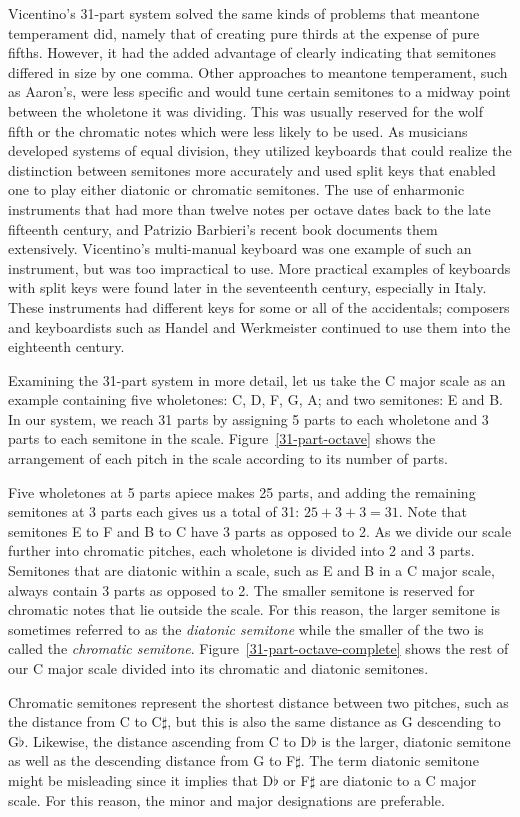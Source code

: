 Vicentino's 31-part system solved the same kinds of problems that meantone temperament
did, namely that of creating pure thirds at the expense of pure fifths. However, it had
the added advantage of clearly indicating that semitones differed in size by one comma.
Other approaches to meantone temperament, such as Aaron's, were less specific and would
tune certain semitones to a midway point between the wholetone it was dividing.  This
was usually reserved for the wolf fifth or the chromatic notes which were less likely
to be used.  As musicians developed systems of equal division, they utilized keyboards
that could realize the distinction between semitones more accurately and used split
keys that enabled one to play either diatonic or chromatic semitones.  The use of
enharmonic instruments that had more than twelve notes per octave dates back to the
late fifteenth century, and Patrizio Barbieri's recent book documents them
extensively.\autocite{PB:1} Vicentino's multi-manual keyboard was one example of such
an instrument, but was too impractical to use. More practical examples of keyboards
with split keys were found later in the seventeenth century, especially in Italy. These
instruments had different keys for some or all of the accidentals; composers and keyboardists
such as Handel and Werkmeister continued to use them into the eighteenth century.
\autocite[108]{MB:1}

Examining the 31-part system in more detail, let us take the C major scale as an example containing
five wholetones: C, D, F, G, A; and two semitones: E and B. In our system, we reach 31 parts by
assigning 5 parts to each wholetone and 3 parts to each semitone in the scale.  
Figure~\ref{31-part-octave} shows the arrangement of each pitch in the scale according to its number of parts.
 
Five wholetones at 5 parts apiece makes 25 parts, and adding
the remaining semitones at 3 parts each gives us a total of 31: $ 25 + 3 + 3 = 31 $. Note that
semitones E to F and B to C have 3 parts as opposed to 2.  As we divide our scale further into
chromatic pitches, each wholetone is divided into 2 and 3 parts.  Semitones that are diatonic within
a scale, such as E and B in a C major scale, always contain 3 parts as opposed to 2. The smaller
semitone is reserved for chromatic notes that lie outside the scale. For this reason, the larger
semitone is sometimes referred to as the \textit{diatonic semitone} while the smaller of the two is
called the \textit{chromatic semitone}. Figure~\ref{31-part-octave-complete} shows the rest of our C
major scale divided into its chromatic and diatonic semitones. 
 
Chromatic semitones represent the shortest distance between two pitches, such as the
distance from C to C$\sharp$, but this is also the same distance as G descending to G$\flat$.
Likewise, the distance ascending from C to D$\flat$ is the larger, diatonic semitone as well as the
descending distance from G to F$\sharp$. The term diatonic semitone might be misleading since it
implies that D$\flat$ or F$\sharp$ are diatonic to a C major scale.  For this reason, the minor and
major designations are preferable.

